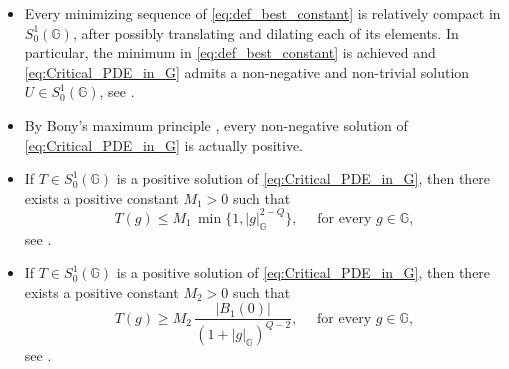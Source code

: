 \documentclass[11pt]{amsart}
\numberwithin{equation}{section} %
\theoremstyle{definition}
\begin{document}
\begin{itemize}
	\item Every minimizing sequence of \eqref{eq:def_best_constant} is relatively compact in $S^{1}_{0}(\mathbb{G})$, after possibly translating and dilating each of its elements. In particular, the minimum in \eqref{eq:def_best_constant} is achieved and \eqref{eq:Critical_PDE_in_G} admits a non-negative and non-trivial solution $U \in S^{1}_{0}(\mathbb{G})$, see \cite[Theorem 6.1]{GaroVa}.
	\item By Bony's maximum principle \cite{Bony}, every non-negative solution of \eqref{eq:Critical_PDE_in_G} is actually positive.
	\item If $T \in S^{1}_{0}(\mathbb{G})$ is a positive solution of \eqref{eq:Critical_PDE_in_G}, then there exists a positive constant $M_1>0$ such that 
	\begin{equation}\label{eq:Stima_Bonf_Ugu}
		T(g) \leq M_1 \, \min \{1, |g|_{\mathbb{G}}^{2-Q}\}, \quad \textrm{ for every } g \in \mathbb{G},
	\end{equation} 
	\noindent see \cite[Theorem 3.4]{BoUg}.
	\item If $T \in S^{1}_{0}(\mathbb{G})$ is a positive solution of \eqref{eq:Critical_PDE_in_G}, then there exists a positive constant $M_2 >0$ such that
	\begin{equation}\label{eq:Stima_Loiudice}
		T(g) \geq M_2 \, \dfrac{|B_{1}(0)|}{(1+|g|_{\mathbb{G}})^{Q-2}}, \quad \textrm{ for every } g \in \mathbb{G},
	\end{equation}
	\noindent see \cite[Lemma 3.2]{Loiudice1}.
\end{itemize}
\end{document}
